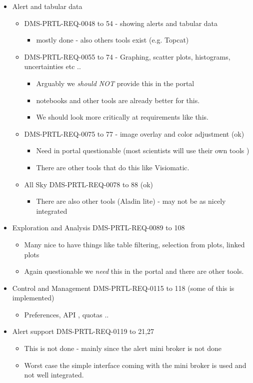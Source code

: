 \begin{itemize}
\item Alert and tabular data
\begin{itemize}
\item DMS-PRTL-REQ-0048 to 54 - showing alerts and tabular data
\begin{itemize}
\item mostly done - also others tools exist (e.g. Topcat)
\end{itemize}
\item DMS-PRTL-REQ-0055 to 74 - Graphing, scatter plots, histograms, uncertainties etc ..
\begin{itemize}
\item Arguably we {\em should NOT } provide this in the portal
\item notebooks and other tools are already better for this.
\item We should look  more critically at requirements like this.
\end{itemize}
\item DMS-PRTL-REQ-0075 to 77 - image overlay and color adjustment (ok)
\begin{itemize}
\item  Need in portal questionable  (most scientists will use their own tools )
\item There are other tools that do this like Visiomatic.
\end{itemize}


\item All Sky  DMS-PRTL-REQ-0078 to 88 (ok)
\begin{itemize}
\item  There are also other tools (Aladin lite) - may not be as nicely integrated
\end{itemize}

\end{itemize}

\item Exploration and Analysis DMS-PRTL-REQ-0089 to 108
\begin{itemize}
\item  Many nice to have things like table filtering, selection from plots, linked plots
\item Again questionable we {\em need} this in the portal and there are other tools.
\end{itemize}

\item Control and Management DMS-PRTL-REQ-0115 to 118 (some of this is implemented)
\begin{itemize}
\item  Preferences, API , quotas ..
\end{itemize}
\item Alert support DMS-PRTL-REQ-0119 to 21,27
\begin{itemize}
\item This is not done - mainly since the alert mini broker is not done
\item Worst case the simple interface coming with the mini broker is used  and not well integrated.
\end{itemize}


\end{itemize}
